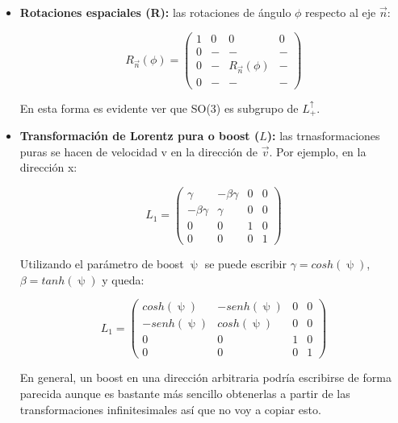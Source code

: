 \documentclass{article}
\begin{document}
        \begin{itemize}
            \item \textbf{Rotaciones espaciales (R):} las rotaciones de ángulo $\phi$ respecto al eje $\Vec{n}$:

            $$R_{\Vec{n}}(\phi) = \left( \begin{array}{c|ccc}
                 1& 0 & 0 & 0  \\
                 \hline
                   0& - & - & -  \\
                     0& - & R_\Vec{n}(\phi) & -  \\
                       0& - & - & -
            \end{array}\right)$$

            En esta forma es evidente ver que SO(3) es subgrupo de $L_+^\uparrow$.

            \newpage

            \item \textbf{Transformación de Lorentz pura o boost  ($L$):} las trnasformaciones puras se hacen de velocidad v en la dirección de $\Vec{v}$. Por ejemplo, en la dirección x:

            $$L_1=\left ( \begin{array}{cccc}
                   \gamma & -\beta \gamma & 0 & 0  \\
                    -\beta \gamma & \gamma & 0 & 0  \\
                      0& 0 & 1 & 0  \\
                        0& 0 & 0 & 1
            \end{array}\right)$$

            Utilizando el parámetro de boost $\uppsi$ se puede escribir $\gamma =cosh(\uppsi)$, $\beta = tanh(\uppsi)$ y queda:

            $$L_1=\left ( \begin{array}{cccc}
                   cosh(\uppsi) & -senh(\uppsi) & 0 & 0  \\
                    -senh(\uppsi) & cosh(\uppsi) & 0 & 0  \\
                      0& 0 & 1 & 0  \\
                        0& 0 & 0 & 1
            \end{array}\right)$$

            En general, un boost en una dirección arbitraria podría escribirse de forma parecida aunque es bastante más sencillo obtenerlas a partir de las transformaciones infinitesimales así que no voy a copiar esto.


\end{itemize}
\end{document}
